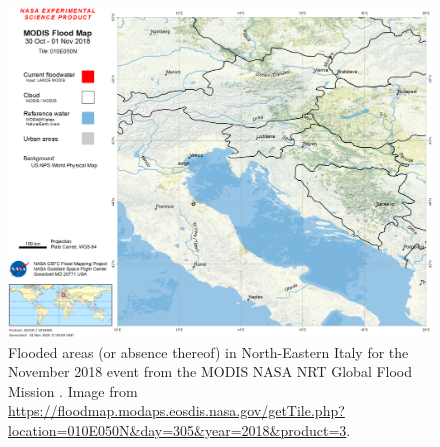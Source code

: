 \begin{figure}
    \centering
    \includegraphics[width=\textwidth]{figures/ita_flood/MFM_2018305_010E050N_3D3OT}
    \decoRule
    \caption[Flooded area in the November 2018 Italian flood]{
        Flooded areas (or absence thereof) in North-Eastern Italy for the November 2018 event from the MODIS NASA NRT Global Flood Mission . Image from \url{https://floodmap.modaps.eosdis.nasa.gov/getTile.php?location=010E050N&day=305&year=2018&product=3}.
} \label{fig:NRT_flood_nov18}
\end{figure}

